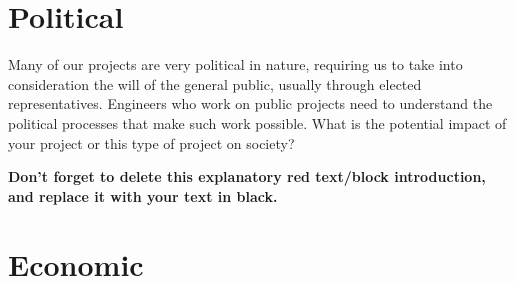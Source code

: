 \section{Political} %

\begin{tcolorbox}[      %
    boxrule=0pt,        %
    colback=white,      %
    coltext=red         %
]                       %
    Many of our projects are very political in nature, requiring us to take into consideration the will of the general public, usually through elected representatives. Engineers who work on public projects need to understand the political processes that make such work possible. What is the potential impact of your project or this type of project on society?
    
    \vspace{15pt}       %
    \begin{center}      %
    \textbf{Don't forget to delete this explanatory red text/block introduction, and replace it with your text in black.}
    \end{center}        %
\end{tcolorbox}         %

\section{Economic} %

